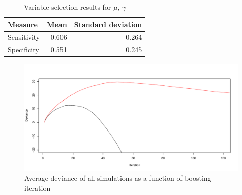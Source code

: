 \begin{table}\caption{Variable selection results for $\mu$, $\gamma$}\label{table:correlated-no-intercept-mu}
\begin{tabular}{l|rr}
Measure     & Mean   & Standard deviation     \\
\hline
Sensitivity &  0.606 & 0.264 \\
Specificity &  0.551 & 0.245
\end{tabular}
\end{table}

\begin{figure}
\caption{Average deviance of all simulations as a function of boosting iteration}
\centering\includegraphics[scale=0.4]{figures/correlated_cv_deviance.pdf}
\end{figure}